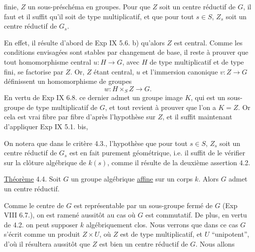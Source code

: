 finie,  $Z$ un sous-préschéma en groupes. Pour que $Z$ soit un centre réductif de $G$, il faut et il suffit qu'il soit de type multiplicatif, et que pour tout $s\in S$,  $Z_s$ soit un centre réductif de $G_s$.

En effet, il résulte d'abord de Exp IX 5.6. b) qu'alors $Z$ est central. Comme les conditions envisagées sont stables par changement de base, il reste à prouver que tout homomorphisme central $u:H\longrightarrow G$, avec $H$ de type multiplicatif et de type fini, se factorise par $Z$. Or, $Z$ étant central, $u$ et l'immersion canonique $v:Z\longrightarrow G$ définissent un homomorphisme de groupes
\[
w:H\times_S Z\longrightarrow G.
\]
En vertu de Exp IX 6.8. ce dernier admet un groupe image $K$, qui est un sous-groupe de type multiplicatif de $G$, et tout revient à prouver que l'on a $K=Z$. Or cela est vrai fibre par fibre d'après l'hypothèse sur $Z$, et il suffit maintenant d'appliquer Exp IX 5.1. bis, 

On notera que dans le critère 4.3., l'hypothèse que pour tout $s\in S$, $Z_s$ soit un centre réductif de $G_s$ est en fait purement géométrique, i.e. il suffit de le vérifier sur la clôture algébrique de $k(s)$, comme il résulte de la deuxième assertion 4.2.

\uline{Théorème} 4.4. Soit $G$ un groupe algébrique \uline{affine} sur un corps $k$. Alors $G$ admet un centre réductif.

Comme le centre de $G$ est représentable par un sous-groupe fermé de $G$ (Exp VIII 6.7.), on est ramené aussitôt au cas où $G$ est commutatif. De plus, en vertu de 4.2. on peut supposer $k$ algébriquement clos. Nous verrons  que dans ce cas $G$ s'écrit comme un produit  $Z\times U$, où $Z$ est de type multiplicatif, et $U$ ``unipotent'', d'où il résultera aussitôt que $Z$ est bien un centre réductif de $G$. Nous allons

